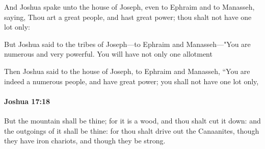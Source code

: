 			\begin{versebox}
					\item[BHS] 
					\item[ASV] And Joshua spake unto the house of Joseph, even to Ephraim and to Manasseh, saying, Thou art a great people, and hast great power; thou shalt not have one lot only:
					\item[NIV] But Joshua said to the tribes of Joseph—to Ephraim and Manasseh—"You are numerous and very powerful. You will have not only one allotment
					\item[NRSV] Then Joshua said to the house of Joseph, to Ephraim and Manasseh, “You are indeed a numerous people, and have great power; you shall not have one lot only,
			\end{versebox}

		\paragraph{Joshua 17:18} %
			\label{JOSHUA-17-18}

			But the mountain shall be thine; for it is a wood, and thou shalt cut it down: and the outgoings of it shall be thine: for thou shalt drive out the Canaanites, though they have iron chariots, and though they be strong.

